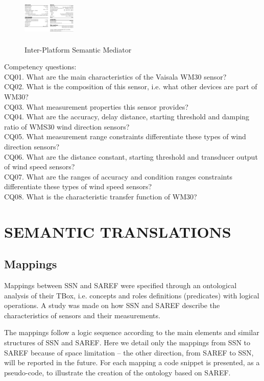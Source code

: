 \documentclass{sig-alternate-05-2015}
\begin{document}
\begin{figure}
\centering
\includegraphics[height=1in, width=1in]{WM30specifications}
\caption{Inter-Platform Semantic Mediator}
\end{figure}

Competency questions: 
\\CQ01. What are the main characteristics of the Vaisala WM30 sensor? 
\\CQ02. What is the composition of this sensor, i.e. what other devices are part of WM30?
\\CQ03. What measurement properties this sensor provides?
\\CQ04. What are the accuracy, delay distance, starting threshold and damping ratio of WMS30 wind direction sensors? \\CQ05. What measurement range constraints differentiate these types of wind direction sensors?
\\CQ06. What are the distance constant, starting threshold and transducer output of wind speed sensors? 
\\CQ07. What are the ranges of accuracy and condition ranges  constraints differentiate these types of wind speed sensors?
\\CQ08. What is the characteristic transfer function of WM30?



\section{SEMANTIC TRANSLATIONS}

\subsection{Mappings}
Mappings between SSN and SAREF were specified through an ontological analysis of their TBox, i.e. concepts and roles definitions (predicates) with logical operations. A study was made on how SSN and SAREF describe the characteristics of sensors and their measurements. 

The mappings follow a logic sequence according to the main elements and similar structures of SSN and SAREF. Here we detail only the mappings from SSN to SAREF because of space limitation – the other direction, from SAREF to SSN, will be reported in the future. For each mapping a code snippet is presented, as a pseudo-code, to illustrate the creation of the ontology based on SAREF.
\end{document}
